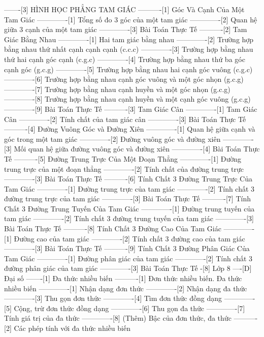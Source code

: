 -------[3] HÌNH HỌC PHẲNG TAM GIÁC
----------[1] Góc Và Cạnh Của Một Tam Giác
-------------[1] Tổng số đo 3 góc của một tam giác
-------------[2] Quan hệ giữa 3 cạnh của một tam giác
-------------[3] Bài Toán Thực Tế
----------[2] Tam Giác Bằng Nhau
-------------[1] Hai tam giác bằng nhau
-------------[2] Trường hợp bằng nhau thứ nhất cạnh cạnh cạnh (c.c.c)
-------------[3] Trường hợp bằng nhau thứ hai cạnh góc cạnh (c.g.c)
-------------[4] Trường hợp bằng nhau thứ ba góc cạnh góc (g.c.g)
-------------[5] Trường hợp bằng nhau hai cạnh góc vuông (c.g.c)
-------------[6] Trường hợp bằng nhau cạnh góc vuông và một góc nhọn (g.c.g)
-------------[7] Trường hợp bằng nhau cạnh huyền và một góc nhọn (g.c.g)
-------------[8] Trường hợp bằng nhau cạnh huyền và một cạnh góc vuông (g.c.g)
-------------[9] Bài Toán Thực Tế
----------[3] Tam Giác Cân
-------------[1] Tam Giác Cân
-------------[2] Tính chất của tam giác cân
-------------[3] Bài Toán Thực Tế
----------[4] Đường Vuông Góc và Đường Xiên
-------------[1] Quan hệ giữa cạnh và góc trong một tam giác
-------------[2] Đường vuông góc và đường xiên
-------------[3] Mối quan hệ giữa đường vuông góc và đường xiên
-------------[4] Bài Toán Thực Tế
----------[5] Đường Trung Trực Của Một Đoạn Thẳng
-------------[1] Đường trung trực của một đoạn thẳng
-------------[2] Tính chất của đường trung trực
-------------[3] Bài Toán Thực Tế
----------[6] Tính Chất 3 Đường Trung Trực Của Tam Giác
-------------[1] Đường trung trực của tam giác
-------------[2] Tính chất 3 đường trung trực của tam giác
-------------[3] Bài Toán Thực Tế
----------[7] Tính Chất 3 Đường Trung Tuyến Của Tam Giác
-------------[1] Đường trung tuyến của tam giác
-------------[2] Tính chất 3 đường trung tuyến của tam giác
-------------[3] Bài Toán Thực Tế
----------[8] Tính Chất 3 Đường Cao Của Tam Giác
-------------[1] Đường cao của tam giác
-------------[2] Tính chất 3 đường cao của tam giác
-------------[3] Bài Toán Thực Tế
----------[9] Tính Chất 3 Đường Phân Giác Của Tam Giác
-------------[1] Đường phân giác của tam giác
-------------[2] Tính chất 3 đường phân giác của tam giác
-------------[3] Bài Toán Thực Tế
-[8] Lớp 8
----[D] Đại số
-------[1] Đa thức nhiều biến
----------[1] Đơn thức nhiều biến. Đa thức nhiều biến
-------------[1] Nhận dạng đơn thức
-------------[2] Nhận dạng đa thức
-------------[3] Thu gọn đơn thức
-------------[4] Tìm đơn thức đồng dạng
-------------[5] Cộng, trừ đơn thức đồng dạng
-------------[6] Thu gọn đa thức
-------------[7] Tính giá trị của đa thức
-------------[8] (Thêm) Bậc của đơn thức, đa thức
----------[2] Các phép tính với đa thức nhiều biến
